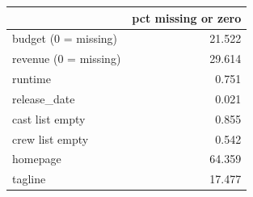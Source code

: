 \begin{tabular}{lr}
\toprule
 & pct missing or zero \\
\midrule
budget (0 = missing) & 21.522 \\
revenue (0 = missing) & 29.614 \\
runtime & 0.751 \\
release\_date & 0.021 \\
cast list empty & 0.855 \\
crew list empty & 0.542 \\
homepage & 64.359 \\
tagline & 17.477 \\
\bottomrule
\end{tabular}